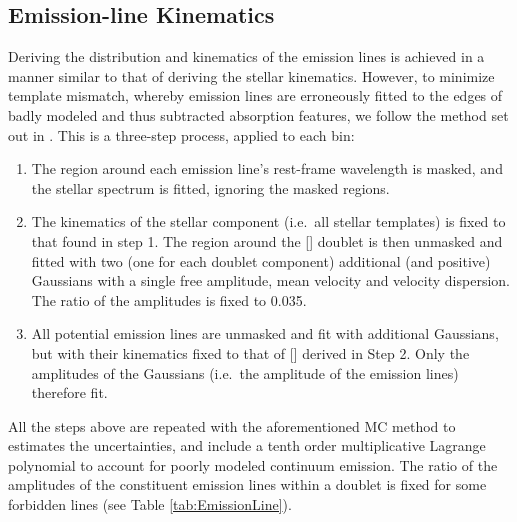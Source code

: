 

	\subsection{Emission-line Kinematics}
		\label{subsec:EmissionFit}
		Deriving the distribution and kinematics of the emission lines is achieved in a manner similar to that of deriving the stellar kinematics. However, to minimize template mismatch, whereby emission lines are erroneously fitted to the edges of badly modeled and thus subtracted absorption features, we follow the method set out in \citet{Sarzi2005}. This is a three-step process, applied to each bin:
		\begin{enumerate}
			\item The region around each emission line's rest-frame wavelength is masked, and the stellar spectrum is fitted, ignoring the masked regions.
			\item The kinematics of the stellar component (i.e.\ all stellar templates) is fixed to that found in step 1. The region around the [] doublet is then unmasked and fitted with two (one for each doublet component) additional (and positive) Gaussians with a single free amplitude, mean velocity and velocity dispersion. The ratio of the amplitudes is fixed to 0.035.
			\item All potential emission lines are unmasked and fit with additional Gaussians, but with their kinematics fixed to that of [] derived in Step 2. Only the amplitudes of the Gaussians (i.e.\ the amplitude of the emission lines) therefore fit. 
		\end{enumerate}
		All the steps above are repeated with the aforementioned MC method to estimates the uncertainties, and include a tenth order multiplicative Lagrange polynomial to account for poorly modeled continuum emission. The ratio of the amplitudes of the constituent emission lines within a doublet is fixed for some forbidden lines (see Table \ref{tab:EmissionLine}).

